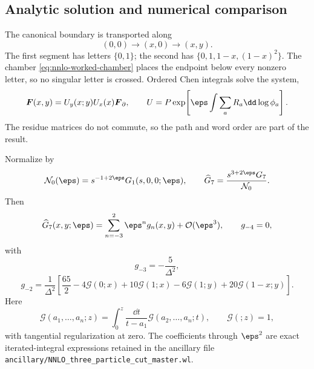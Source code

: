 \subsection{Analytic solution and numerical comparison}

The canonical boundary is transported along
\begin{equation}
 (0,0)\longrightarrow(x,0)\longrightarrow(x,y).
 \label{eq:nnlo-transport-path}
\end{equation}
The first segment has letters $\{0,1\}$; the second has
$\{0,1,1-x,(1-x)^2\}$.  The chamber
\eqref{eq:nnlo-worked-chamber} places the endpoint below every nonzero letter,
so no singular letter is crossed.  Ordered Chen integrals solve the system,
\begin{equation}
 \boldsymbol F(x,y)
 =U_y(x;y)U_x(x)\boldsymbol F_\partial,
 \qquad
 U=P\exp\!\left[\eps\int\sum_aR_a\dd\log\phi_a\right].
 \label{eq:nnlo-ordered-transport}
\end{equation}
The residue matrices do not commute, so the path and word order are part of
the result.

Normalize by
\begin{equation}
 \mathcal N_0(\eps)=s^{-1+2\eps}G_1(s,0,0;\eps),
 \qquad
 \widehat G_7=\frac{s^{3+2\eps}G_7}{\mathcal N_0}.
 \label{eq:nnlo-top-normalization}
\end{equation}
Then
\begin{equation}
 \widehat G_7(x,y;\eps)
 =\sum_{n=-3}^{2}\eps^ng_n(x,y)+\mathcal O(\eps^3),
 \qquad g_{-4}=0,
 \label{eq:nnlo-top-series}
\end{equation}
with
\begin{equation}
 g_{-3}=-\frac{5}{\Delta^2},
 \label{eq:nnlo-gminus3}
\end{equation}
\begin{equation}
 g_{-2}=\frac{1}{\Delta^2}
 \left[\frac{65}{2}-4\mathcal G(0;x)+10\mathcal G(1;x)
 -6\mathcal G(1;y)+20\mathcal G(1-x;y)\right].
 \label{eq:nnlo-gminus2}
\end{equation}
Here
\begin{equation}
 \mathcal G(a_1,\ldots,a_n;z)
 =\int_0^z\frac{\dd t}{t-a_1}\mathcal G(a_2,\ldots,a_n;t),
 \qquad \mathcal G(;z)=1,
 \label{eq:nnlo-gpl-definition}
\end{equation}
with tangential regularization at zero.  The coefficients through
$\eps^2$ are exact iterated-integral expressions retained in the ancillary
file \texttt{ancillary/NNLO\_three\_particle\_cut\_master.wl}.

